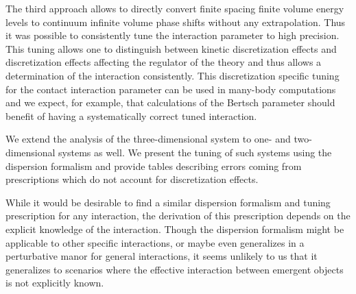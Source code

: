 The third approach allows to directly convert finite spacing finite volume energy levels to continuum infinite volume phase shifts without any extrapolation.
Thus it was possible to consistently tune the interaction parameter to high precision.
This tuning allows one to distinguish between kinetic discretization effects and discretization effects affecting the regulator of the theory and thus allows a determination of the interaction consistently.
This discretization specific tuning for the contact interaction parameter can be used in many-body computations and we expect, for example, that calculations of the Bertsch parameter should benefit of having a systematically correct tuned interaction.

We extend the analysis of the three-dimensional system to one- and two-dimensional systems as well.
We present the tuning of such systems using the dispersion formalism and provide tables describing errors coming from prescriptions which do not account for discretization effects.

While it would be desirable to find a similar dispersion formalism and tuning prescription for any interaction, the derivation of this prescription depends on the explicit knowledge of the interaction.
Though the dispersion formalism might be applicable to other specific interactions, or maybe even generalizes in a perturbative manor for general interactions, it seems unlikely to us that it generalizes to scenarios where the effective interaction between emergent objects is not explicitly known.


